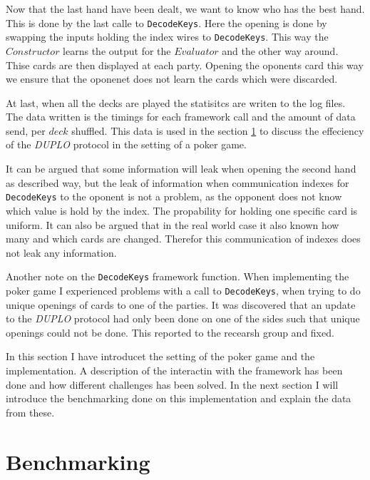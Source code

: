 \documentclass[twoside,11pt,openright]{report}
\newcommand{\DUPLO}{\textit{DUPLO} }
\begin{document}
Now that the last hand have been dealt, we want to know who has the best hand. This is done by the last calle to \verb|DecodeKeys|. Here the opening is done by swapping the inputs holding the index wires to \verb|DecodeKeys|. This way the $Constructor$ learns the output for the $Evaluator$ and the other way around. Thise cards are then displayed at each party. Opening the oponents card this way we ensure that the oponenet does not learn the cards which were discarded.

At last, when all the decks are played the statisitcs are writen to the log files. The data written is the timings for each framework call and the amount of data send, per $deck$ shuffled. This data is used in the section \ref{sec:bechmarking} to discuss the effeciency of the \DUPLO protocol in the setting of a poker game.

\bigskip

It can be argued that some information will leak when opening the second hand as described way, but the leak of information when communication indexes for \verb|DecodeKeys| to the oponent is not a problem, as the opponent does not know which value is hold by the index. The propability for holding one specific card is uniform. It can also be argued that in the real world case it also known how many and which cards are changed. Therefor this communication of indexes does not leak any information.

\bigskip

Another note on the \verb|DecodeKeys| framework function. When implementing the poker game I experienced problems with a call to \verb|DecodeKeys|, when trying to do unique openings of cards to one of the parties. It was discovered that an update to the \DUPLO protocol had only been done on one of the sides such that unique openings could not be done. This reported to the recearsh group and fixed.

\bigskip

In this section I have introducet the setting of the poker game and the implementation. A description of the interactin with the framework has been done and how different challenges has been solved. In the next section I will introduce the benchmarking done on this implementation and explain the data from these.

\section{Benchmarking}
\label{sec:bechmarking}
\end{document}
